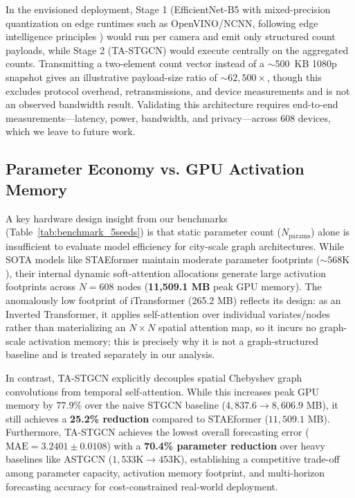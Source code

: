 \documentclass[journal,twocolumn]{IEEEtran}
\begin{document}
In the envisioned deployment, Stage 1 (EfficientNet-B5 with mixed-precision quantization on edge runtimes such as OpenVINO/NCNN, following edge intelligence principles \cite{edge_intelligence, edge_its_survey}) would run per camera and emit only structured count payloads, while Stage 2 (TA-STGCN) would execute centrally on the aggregated counts. Transmitting a two-element count vector instead of a $\sim$500~KB 1080p snapshot gives an illustrative payload-size ratio of $\sim$$62{,}500\times$, though this excludes protocol overhead, retransmissions, and device measurements and is not an observed bandwidth result. Validating this architecture requires end-to-end measurements---latency, power, bandwidth, and privacy---across 608 devices, which we leave to future work.

\subsection{Parameter Economy vs. GPU Activation Memory}

A key hardware design insight from our benchmarks (Table~\ref{tab:benchmark_5seeds}) is that static parameter count ($N_{\text{params}}$) alone is insufficient to evaluate model efficiency for city-scale graph architectures. While SOTA models like STAEformer maintain moderate parameter footprints ($\sim 568\text{K}$), their internal dynamic soft-attention allocations generate large activation footprints across $N=608$ nodes (\textbf{11,509.1 MB} peak GPU memory). The anomalously low footprint of iTransformer (265.2 MB) reflects its design: as an Inverted Transformer, it applies self-attention over individual variates/nodes rather than materializing an $N \times N$ spatial attention map, so it incurs no graph-scale activation memory; this is precisely why it is not a graph-structured baseline and is treated separately in our analysis.

In contrast, TA-STGCN explicitly decouples spatial Chebyshev graph convolutions from temporal self-attention. While this increases peak GPU memory by $77.9\%$ over the naive STGCN baseline ($4,837.6 \to 8,606.9$ MB), it still achieves a \textbf{25.2\% reduction} compared to STAEformer ($11,509.1$ MB). Furthermore, TA-STGCN achieves the lowest overall forecasting error ($\text{MAE} = \mathbf{3.2401 \pm 0.0108}$) with a \textbf{70.4\% parameter reduction} over heavy baselines like ASTGCN ($1,533\text{K} \to 453\text{K}$), establishing a competitive trade-off among parameter capacity, activation memory footprint, and multi-horizon forecasting accuracy for cost-constrained real-world deployment.
\end{document}
